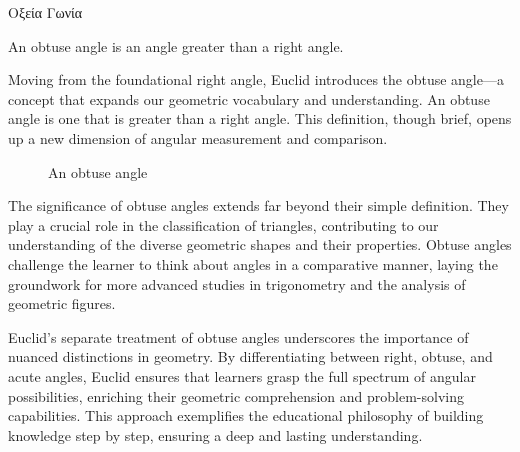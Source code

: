 
\begin{defin}
\textgreek{Οξεία Γωνία}

An obtuse angle is an angle greater than a right angle.
\end{defin}

Moving from the foundational right angle, Euclid introduces the obtuse angle—a concept that expands our geometric vocabulary and understanding. An obtuse angle is one that is greater than a right angle. This definition, though brief, opens up a new dimension of angular measurement and comparison.

\begin{figure}[H]
	\centering
	\caption{An obtuse angle}
\end{figure}

The significance of obtuse angles extends far beyond their simple definition. They play a crucial role in the classification of triangles, contributing to our understanding of the diverse geometric shapes and their properties. Obtuse angles challenge the learner to think about angles in a comparative manner, laying the groundwork for more advanced studies in trigonometry and the analysis of geometric figures.

Euclid's separate treatment of obtuse angles underscores the importance of nuanced distinctions in geometry. By differentiating between right, obtuse, and acute angles, Euclid ensures that learners grasp the full spectrum of angular possibilities, enriching their geometric comprehension and problem-solving capabilities. This approach exemplifies the educational philosophy of building knowledge step by step, ensuring a deep and lasting understanding.